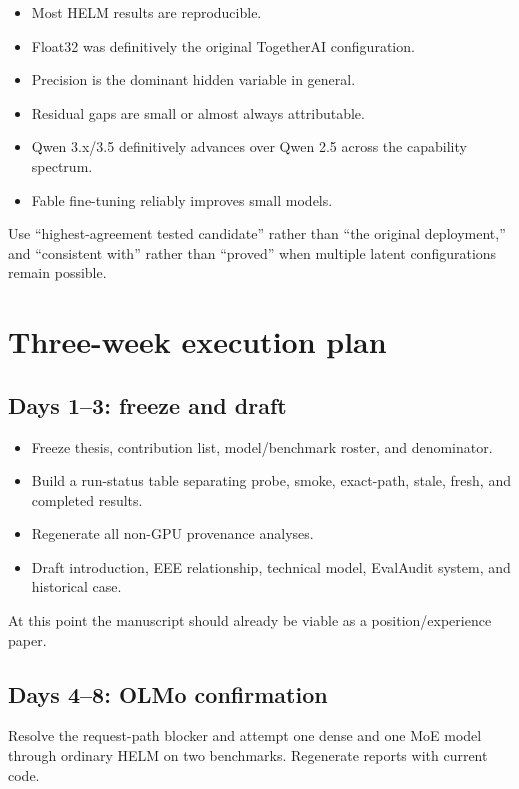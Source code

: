 \documentclass[11pt]{article}
\begin{document}
\begin{itemize}
  \item Most HELM results are reproducible.
  \item Float32 was definitively the original TogetherAI configuration.
  \item Precision is the dominant hidden variable in general.
  \item Residual gaps are small or almost always attributable.
  \item Qwen 3.x/3.5 definitively advances over Qwen 2.5 across the capability spectrum.
  \item Fable fine-tuning reliably improves small models.
\end{itemize}

Use ``highest-agreement tested candidate'' rather than ``the original deployment,'' and ``consistent with'' rather than ``proved'' when multiple latent configurations remain possible.

\section{Three-week execution plan}

\subsection{Days 1--3: freeze and draft}

\begin{itemize}
  \item Freeze thesis, contribution list, model/benchmark roster, and denominator.
  \item Build a run-status table separating probe, smoke, exact-path, stale, fresh, and completed results.
  \item Regenerate all non-GPU provenance analyses.
  \item Draft introduction, EEE relationship, technical model, EvalAudit system, and historical case.
\end{itemize}

At this point the manuscript should already be viable as a position/experience paper.

\subsection{Days 4--8: OLMo confirmation}

Resolve the request-path blocker and attempt one dense and one MoE model through ordinary HELM on two benchmarks. Regenerate reports with current code.
\end{document}
